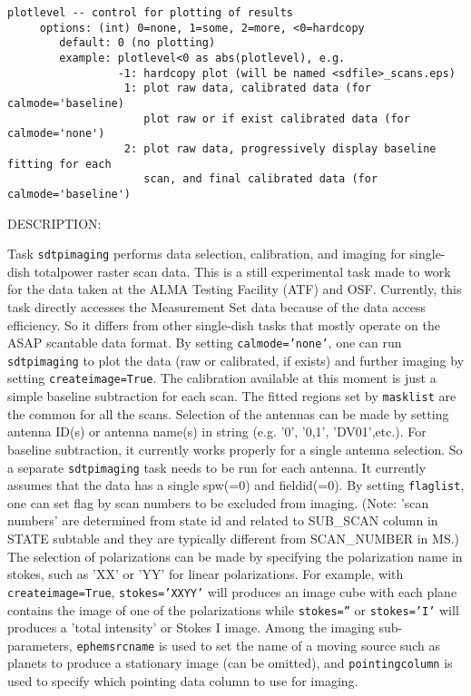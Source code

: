 \begin{verbatim}
plotlevel -- control for plotting of results
     options: (int) 0=none, 1=some, 2=more, <0=hardcopy
        default: 0 (no plotting)
        example: plotlevel<0 as abs(plotlevel), e.g.
                 -1: hardcopy plot (will be named <sdfile>_scans.eps)
                  1: plot raw data, calibrated data (for calmode='baseline)
                     plot raw or if exist calibrated data (for calmode='none')
                  2: plot raw data, progressively display baseline fitting for each 
                     scan, and final calibrated data (for calmode='baseline')  

\end{verbatim}
DESCRIPTION:

        Task {\tt sdtpimaging} performs data selection, calibration, and imaging for single-dish
        totalpower raster scan data.  This is a still experimental task made to work for
        the data taken at the ALMA Testing Facility (ATF) and OSF. Currently, this task directly
        accesses the Measurement Set data because of the data access efficiency.
        So it differs from other single-dish tasks that mostly operate on the ASAP scantable
        data format.  By setting {\tt calmode='none'}, one can run {\tt sdtpimaging} to plot the data
        (raw or calibrated, if exists) and further imaging by setting {\tt createimage=True}.
        The calibration available at this moment is just a simple baseline subtraction for
        each scan. The fitted regions set by {\tt masklist} are the common for all the scans.
        Selection of the antennas can be made by setting antenna ID(s) or antenna name(s)
        in string (e.g. '0', '0,1', 'DV01',etc.).
        For baseline subtraction, it currently works properly for a single antenna selection.
        So a separate {\tt sdtpimaging} task needs to be run for each antenna.
        It currently assumes that the data has a single spw(=0) and fieldid(=0).
        By setting {\tt flaglist}, one can set flag by scan numbers to be excluded from imaging.
        (Note: 'scan numbers' are determined from state id and related to SUB\_SCAN column in STATE
        subtable and they are typically different from SCAN\_NUMBER in MS.)
        The selection of polarizations can be made by specifying the polarization name in stokes,
        such as 'XX' or 'YY' for linear polarizations. For example, with {\tt createimage=True},
        {\tt stokes='XXYY'} will produces an image cube with each plane contains the image of one of 
        the polarizations while {\tt stokes=''} or {\tt stokes='I'} will produces a 'total intensity' or Stokes I image. 
        Among the imaging sub-parameters, {\tt ephemsrcname} is used to set the name of 
        a moving source such as planets to produce a stationary image (can be omitted), and
        {\tt pointingcolumn} is
        used to specify which pointing data column to use for imaging.

